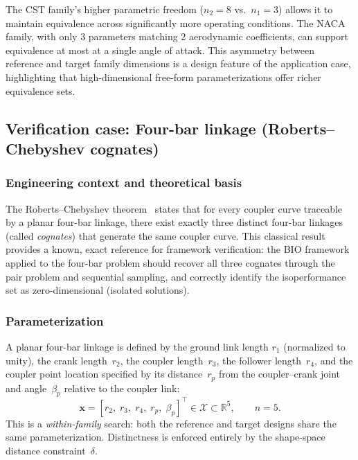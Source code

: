 The CST family's higher parametric freedom ($n_2 = 8$ vs.\ $n_1 = 3$) allows it to maintain equivalence across significantly more operating conditions. The NACA family, with only 3 parameters matching 2 aerodynamic coefficients, can support equivalence at most at a single angle of attack. This asymmetry between reference and target family dimensions is a design feature of the application case, highlighting that high-dimensional free-form parameterizations offer richer equivalence sets.


\subsection{Verification case: Four-bar linkage (Roberts--Chebyshev cognates)}
\label{sec:fourbar}

\subsubsection{Engineering context and theoretical basis}

The Roberts--Chebyshev theorem~\citep{roberts1875three,hunt1978kinematic} states that for every coupler curve traceable by a planar four-bar linkage, there exist exactly three distinct four-bar linkages (called \emph{cognates}) that generate the same coupler curve. This classical result provides a known, exact reference for framework verification: the BIO framework applied to the four-bar problem should recover all three cognates through the pair problem and sequential sampling, and correctly identify the isoperformance set as zero-dimensional (isolated solutions).


\subsubsection{Parameterization}

A planar four-bar linkage is defined by the ground link length $r_1$ (normalized to unity), the crank length~$r_2$, the coupler length~$r_3$, the follower length~$r_4$, and the coupler point location specified by its distance~$r_p$ from the coupler--crank joint and angle~$\beta_p$ relative to the coupler link:
\begin{equation}
    \mathbf{x} = [r_2,\; r_3,\; r_4,\; r_p,\; \beta_p]^\top \in \mathcal{X} \subset \mathbb{R}^5, \qquad n = 5.
    \label{eq:fourbar_params}
\end{equation}
This is a \emph{within-family} search: both the reference and target designs share the same parameterization. Distinctness is enforced entirely by the shape-space distance constraint~$\delta$.


